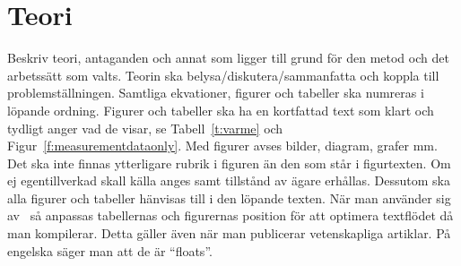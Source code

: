 \documentclass[a4paper]{article}
\begin{document}
%

\newpage
\section{Teori}\label{s:teori}
Beskriv teori, antaganden och annat som ligger till grund för den metod och det arbetssätt som valts. Teorin ska belysa/diskutera/sammanfatta och koppla till problemställningen. Samtliga ekvationer, figurer och tabeller ska numreras i löpande ordning. Figurer och tabeller ska ha en kortfattad text som klart och tydligt anger vad de visar, se Tabell~\ref{t:varme} och Figur~\ref{f:measurementdataonly}. Med figurer avses bilder, diagram, grafer mm. Det ska inte finnas ytterligare rubrik i figuren än den som står i figurtexten. Om ej egentillverkad skall källa anges samt tillstånd av ägare erhållas. Dessutom ska alla figurer och tabeller hänvisas till i den löpande texten. När man använder sig av \LaTeXe\ så anpassas tabellernas och figurernas position för att optimera textflödet då man kompilerar. Detta gäller även när man publicerar vetenskapliga artiklar. På engelska säger man att de är ``floats''.
\end{document}
